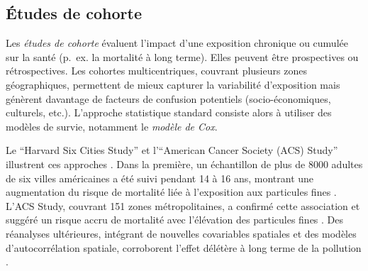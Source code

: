 \subsection{Études de cohorte}
Les \emph{études de cohorte} \citep{BellSametDominici2004} évaluent l'impact d'une exposition chronique ou cumulée sur la santé (p.~ex. la mortalité à long terme). Elles peuvent être prospectives ou rétrospectives. Les cohortes multicentriques, couvrant plusieurs zones géographiques, permettent de mieux capturer la variabilité d'exposition mais génèrent davantage de facteurs de confusion potentiels (socio-économiques, culturels, etc.). L'approche statistique standard consiste alors à utiliser des modèles de survie, notamment le \emph{modèle de Cox}.

Le ``Harvard Six Cities Study'' et l'``American Cancer Society (ACS) Study'' illustrent ces approches \citep{DockeryPopeXu1993,PopeThunNamboodiri1995,Pope2007}. Dans la première, un échantillon de plus de 8000 adultes de six villes américaines a été suivi pendant 14 à 16 ans, montrant une augmentation du risque de mortalité liée à l'exposition aux particules fines \citep{DockeryPopeXu1993}. L'ACS Study, couvrant 151 zones métropolitaines, a confirmé cette association et suggéré un risque accru de mortalité avec l'élévation des particules fines \citep{PopeThunNamboodiri1995}. Des réanalyses ultérieures, intégrant de nouvelles covariables spatiales et des modèles d'autocorrélation spatiale, corroborent l'effet délétère à long terme de la pollution \citep{LadenSchwartzSpeizerDockery2006,KrewskiJerrettPope2009,Pope2007}.

